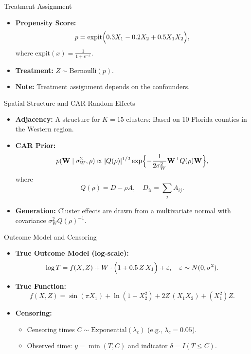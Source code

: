 \documentclass{beamer}
\begin{document}
  
  \begin{frame}{Treatment Assignment}
    \begin{itemize}
      \item \textbf{Propensity Score:}
        \[
        p = \text{expit}\Bigl(0.3X_1 - 0.2X_2 + 0.5X_1X_2\Bigr),
        \]
        where \(\text{expit}(x)=\frac{1}{1+e^{-x}}\).
      \item \textbf{Treatment:} \(Z \sim \text{Bernoulli}(p)\).
      \item \textbf{Note:} Treatment assignment depends on the confounders.
    \end{itemize}
  \end{frame}
  
  \begin{frame}{Spatial Structure and CAR Random Effects}
    \begin{itemize}
      \item \textbf{Adjacency:} A structure for \(K=15\) clusters: Based on 10 Florida counties in the Western region.
      \item \textbf{CAR Prior:}
        \[
        p(\mathbf{W}\mid\sigma^2_W,\rho) \propto |Q(\rho)|^{1/2}\exp\Bigl\{-\frac{1}{2\sigma^2_W}\mathbf{W}^\top Q(\rho)\mathbf{W}\Bigr\},
        \]
        where
        \[
        Q(\rho)=D-\rho A,\quad D_{ii}=\sum_j A_{ij}.
        \]
      \item \textbf{Generation:} Cluster effects are drawn from a multivariate normal with covariance \(\sigma^2_W Q(\rho)^{-1}\).
    \end{itemize}
  \end{frame}
  
  \begin{frame}{Outcome Model and Censoring}
    \begin{itemize}
      \item \textbf{True Outcome Model (log-scale):}
        \[
        \log T = f(X,Z) + W\cdot\Bigl(1+0.5\,Z\,X_1\Bigr) + \varepsilon,\quad \varepsilon\sim N(0,\sigma^2).
        \]
      \item \textbf{True Function:}
        \[
        f(X,Z) = \sin(\pi X_1) + \ln(1+X_2^2) + 2Z\,(X_1X_2) + (X_1^2)Z.
        \]

      \item \textbf{Censoring:} 
        \begin{itemize}
          \item Censoring times \(C \sim \text{Exponential}(\lambda_c)\) (e.g., \(\lambda_c=0.05\)).
          \item Observed time: \(y = \min(T, C)\) and indicator \(\delta = I(T\le C)\).
        \end{itemize}
    \end{itemize}
  \end{frame}
  
\end{document}
